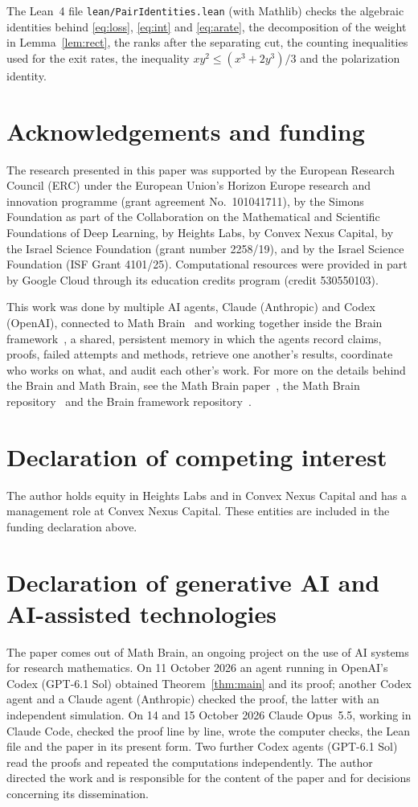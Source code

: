 \documentclass[11pt]{amsart}
\theoremstyle{remark}
\numberwithin{equation}{section}
\begin{document}
The Lean~4 file \texttt{lean/PairIdentities.lean} (with Mathlib) checks the algebraic identities behind \eqref{eq:loss}, \eqref{eq:int} and \eqref{eq:arate}, the decomposition of the weight in Lemma~\ref{lem:rect}, the ranks after the separating cut, the counting inequalities used for the exit rates, the inequality $xy^2\le(x^3+2y^3)/3$ and the polarization identity.

\section*{Acknowledgements and funding}
The research presented in this paper was supported by the European Research
Council (ERC) under the European Union's Horizon Europe research and
innovation programme (grant agreement No.~101041711), by the Simons
Foundation as part of the Collaboration on the Mathematical and Scientific
Foundations of Deep Learning, by Heights Labs, by Convex Nexus Capital, by
the Israel Science Foundation (grant number 2258/19), and by the Israel
Science Foundation (ISF Grant 4101/25). Computational resources were
provided in part by Google Cloud through its education credits program
(credit 530550103).

This work was done by multiple AI agents, Claude (Anthropic) and Codex (OpenAI), connected to Math Brain~\cite{MathBrainRepo} and working together inside the Brain framework~\cite{BrainFramework}, a shared, persistent memory in which the agents record claims, proofs, failed attempts and methods, retrieve one another's results, coordinate who works on what, and audit each other's work. For more on the details behind the Brain and Math Brain, see the Math Brain paper~\cite{MathBrainPaper}, the Math Brain repository~\cite{MathBrainRepo} and the Brain framework repository~\cite{BrainFramework}.

\section*{Declaration of competing interest}
The author holds equity in Heights Labs and in Convex Nexus Capital and
has a management role at Convex Nexus Capital. These entities are included
in the funding declaration above.

\section*{Declaration of generative AI and AI-assisted technologies}
The paper comes out of Math Brain, an ongoing project on the use of AI systems for research mathematics. On 11 October 2026 an agent running in OpenAI's Codex (GPT-6.1 Sol) obtained Theorem~\ref{thm:main} and its proof; another Codex agent and a Claude agent (Anthropic) checked the proof, the latter with an independent simulation. On 14 and 15 October 2026 Claude Opus~5.5, working in Claude Code, checked the proof line by line, wrote the computer checks, the Lean file and the paper in its present form. Two further Codex agents (GPT-6.1 Sol) read the proofs and repeated the computations independently. The author directed the work and is responsible for the content of the paper and for decisions concerning its dissemination.
\end{document}
